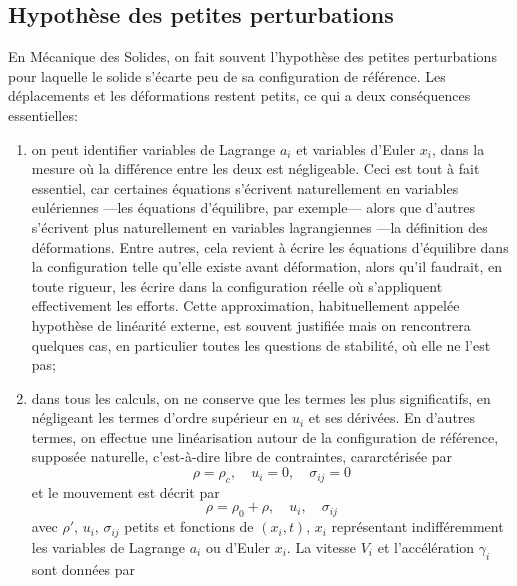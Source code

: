 \subsection{Hypothèse des petites perturbations} \label{ssec:Ch03-2.1}
En Mécanique des Solides, on fait souvent l'hypothèse des petites perturbations pour laquelle le solide s'écarte peu de sa configuration de référence. Les déplacements et les déformations restent petits, ce qui a deux conséquences essentielles:
\begin{enumerate}
    \item on peut identifier variables de Lagrange $a_i$ et variables d'Euler $x_i$, dans la mesure où la différence entre les deux est négligeable.
        Ceci est tout à fait essentiel, car certaines équations s'écrivent naturellement en variables eulériennes ---les équations d'équilibre, par exemple--- alors que d'autres s'écrivent plus naturellement en variables lagrangiennes ---la définition des déformations.
        Entre autres, cela revient à écrire les équations d'équilibre dans la configuration telle qu'elle existe avant déformation, alors qu'il faudrait, en toute rigueur, les écrire dans la configuration réelle où s'appliquent effectivement les efforts.
        Cette approximation, habituellement appelée hypothèse de linéarité externe, est souvent justifiée mais on rencontrera quelques cas, en particulier toutes les questions de stabilité, où elle ne l'est pas;
    \item dans tous les calculs, on ne conserve que les termes les plus significatifs, en négligeant les termes d'ordre supérieur en $u_i$ et ses dérivées.
        En d'autres termes, on effectue une linéarisation autour de la configuration de référence, supposée naturelle, c'est-à-dire libre de contraintes, cararctérisée par 
        \begin{equation}
            \rho = \rho_c, \quad u_i = 0, \quad \sigma_{ij} = 0
            \label{eq:Ch03-024}
        \end{equation}
        et le mouvement est décrit par
        \begin{equation}
            \rho = \rho_0 + \rho, \quad u_i, \quad \sigma_{ij}
            \label{eq:Ch03-025}
        \end{equation}
        avec $\rho'$, $u_i$, $\sigma_{ij}$ petits et fonctions de $\left( x_i,t \right)$, $x_i$ représentant indifféremment les variables de Lagrange $a_i$ ou d'Euler $x_i$.
        La vitesse $V_i$ et l'accélération $\gamma_i$ sont données par
        \begin{equation}

\end{equation}
\end{enumerate}
